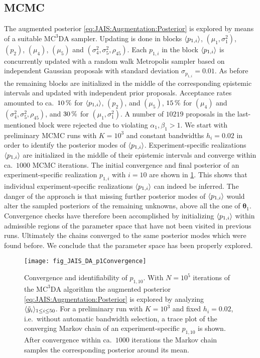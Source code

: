 \subsection{MCMC}
The augmented posterior \cref{eq:JAIS:Augmentation:Posterior} is explored by means of a suitable \(\text{MC}^3\text{DA}\) sampler.
Updating is done in blocks \(\langle{p_{1,i}}\rangle\), \((\mu_1,\sigma^2_1)\), \((p_2)\), \((\mu_4)\), \((\mu_5)\) and \((\sigma^2_4,\sigma^2_5,\rho_{45})\).
Each \(p_{1,i}\) in the block \(\langle{p_{1,i}}\rangle\) is concurrently updated with a random walk Metropolis sampler based on independent Gaussian proposals with standard deviation \(\sigma_{p_{1,i}} = 0.01\).
As before the remaining blocks are initialized in the middle of the corresponding epistemic intervals and updated with independent prior proposals.
Acceptance rates amounted to ca.\ \(\unit[10]{\%}\) for \(\langle{p_{1,i}}\rangle\), \((p_2)\), and \((\mu_5)\),
\(\unit[15]{\%}\) for \((\mu_4)\) and \((\sigma^2_4,\sigma^2_5,\rho_{45})\), and \(\unit[30]{\%}\) for \((\mu_1,\sigma^2_1)\).
A number of \(10219\) proposals in the last-mentioned block were rejected due to violating \(\alpha_1,\beta_1>1\).
We start with preliminary MCMC runs with \(K=10^3\) and constant bandwidths \(h_i=0.02\) in order to identify the posterior modes of \(\langle{p_{1,i}}\rangle\).
Experiment-specific realizations \(\langle{p_{1,i}}\rangle\) are initialized in the middle of their epistemic intervals and converge within ca.\ \(1000\) MCMC iterations.
The initial convergence and final posterior of an experiment-specific realization \(p_{1,i}\) with \(i=10\) are shown in \cref{pre:JAIS:p1Convergence}.
This shows that individual experiment-specific realizations \(\langle{p_{1,i}}\rangle\) can indeed be inferred.
The danger of the approach is that missing further posterior modes of \(\langle{p_{1,i}}\rangle\) would alter the sampled posteriors of the remaining unknowns, above all the one of \(\bm{\theta}_1\).
Convergence checks have therefore been accomplished by initializing \(\langle{p_{1,i}}\rangle\) within admissible regions of the parameter space that have not been visited in previous runs.
Ultimately the chains converged to the same posterior modes which were found before.
We conclude that the parameter space has been properly explored.
\begin{figure}[htbp]
  \centering
  \texttt{[image: fig\_JAIS\_DA\_p1Convergence]}
  \caption[Convergence and identifiability of \(p_{1,10}\)]{Convergence and identifiability of \(p_{1,10}\).
           With \(N=10^5\) iterations of the \(\text{MC}^3\text{DA}\) algorithm the augmented posterior \cref{eq:JAIS:Augmentation:Posterior} is explored by analyzing \(\langle{\tilde{y}_i}\rangle_{1 \leq i \leq 50}\).
           For a preliminary run with \(K=10^3\) and fixed \(h_i=0.02\), i.e.\ without automatic bandwidth selection, a trace plot of the converging Markov chain of an experiment-specific \(p_{1,10}\) is shown.
           After convergence within ca.\ \(1000\) iterations the Markov chain samples the corresponding posterior around its mean.
          }
  \label{pre:JAIS:p1Convergence}
\end{figure}
